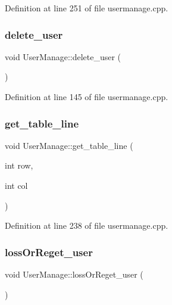 Definition at line 251 of file usermanage.\+cpp.

\mbox{\label{class_user_manage_a254765c27c79b94370dd9f1e44551355}} 
\subsubsection{\texorpdfstring{delete\_user}{delete\_user}}
{\footnotesize\ttfamily void User\+Manage\+::delete\+\_\+user (\begin{DoxyParamCaption}{ }\end{DoxyParamCaption})\hspace{0.3cm}{\ttfamily [slot]}}



Definition at line 145 of file usermanage.\+cpp.

\mbox{\label{class_user_manage_acf5b626b21868282ff4ad9dcccf8c765}} 
\subsubsection{\texorpdfstring{get\_table\_line}{get\_table\_line}}
{\footnotesize\ttfamily void User\+Manage\+::get\+\_\+table\+\_\+line (\begin{DoxyParamCaption}\item[{int}]{row,  }\item[{int}]{col }\end{DoxyParamCaption})\hspace{0.3cm}{\ttfamily [slot]}}



Definition at line 238 of file usermanage.\+cpp.

\mbox{\label{class_user_manage_a82a9b76e62d1d7383e264019066082b8}} 
\subsubsection{\texorpdfstring{lossOrReget\_user}{lossOrReget\_user}}
{\footnotesize\ttfamily void User\+Manage\+::loss\+Or\+Reget\+\_\+user (\begin{DoxyParamCaption}{ }\end{DoxyParamCaption})\hspace{0.3cm}{\ttfamily [slot]}}




